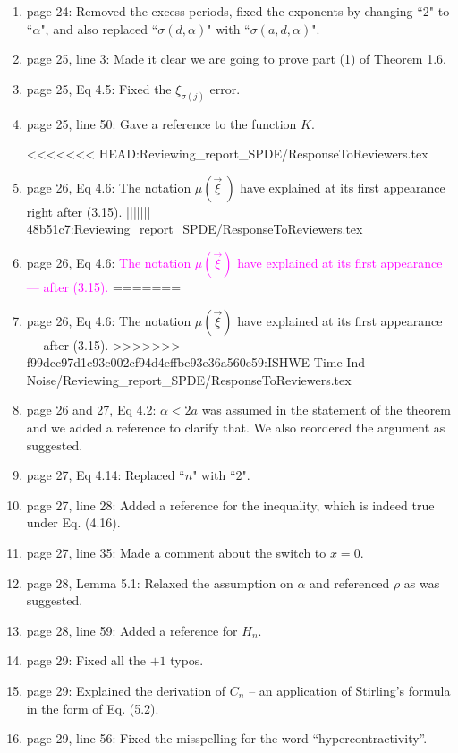 \documentclass[12pt]{article}%
\theoremstyle{plain}
\theoremstyle{definition}
\numberwithin{equation}{section}
\begin{document}
\begin{enumerate}
  \item[49.] page 24: Removed the excess periods, fixed the exponents by
    changing ``$2$" to ``$\alpha$", and also replaced ``$\sigma(d,\alpha)$"
    with ``$\sigma(a,d,\alpha)$".
  \item[50.] page 25, line 3: Made it clear we are going to prove part (1) of
    Theorem 1.6.
  \item[51.] page 25, Eq 4.5: Fixed the $\xi_{\sigma(j)}$ error.
  \item[52.] page 25, line 50: Gave a reference to the function $K$.

<<<<<<< HEAD:Reviewing_report_SPDE/ResponseToReviewers.tex
  \item[53.] page 26, Eq 4.6: The notation $\mu(\vec{\xi}\:)$ have explained at
    its first appearance right after (3.15).
||||||| 48b51c7:Reviewing_report_SPDE/ResponseToReviewers.tex
  \item[53.] page 26, Eq 4.6: \textcolor{magenta}{The notation $\mu(\vec{\xi})$
    have explained at its first appearance --- after (3.15).}
=======
  \item[53.] page 26, Eq 4.6: The notation $\mu(\vec{\xi})$
    have explained at its first appearance --- after (3.15).
>>>>>>> f99dcc97d1c93c002cf94d4effbe93e36a560e59:ISHWE Time Ind Noise/Reviewing_report_SPDE/ResponseToReviewers.tex

  \item[54.] page 26 and 27, Eq 4.2: $\alpha < 2a$ was assumed in the statement
    of the theorem and we added a reference to clarify that. We also reordered
    the argument as suggested.
  \item[55.] page 27, Eq 4.14: Replaced ``$n$" with ``$2$".
  \item[56.] page 27, line 28: Added a reference for the inequality, which is
    indeed true under Eq. (4.16).
  \item[57.] page 27, line 35: Made a comment about the switch to $x=0$.

  \item[58.] page 28, Lemma 5.1: Relaxed the assumption on $\alpha$ and
    referenced $\rho$ as was suggested.

  \item[59.] page 28, line 59: Added a reference for $H_n$.

  \item[60.] page 29: Fixed all the $+1$ typos.
  \item[61.] page 29: Explained the derivation of $C_n$ -- an application of Stirling's formula in
    the form of Eq. (5.2).
  \item[62.] page 29, line 56: Fixed the misspelling for the word ``hypercontractivity''.


\end{enumerate}
\end{document}
